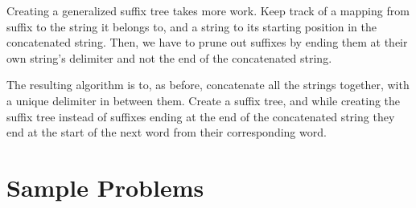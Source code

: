\documentclass[11pt, oneside]{article}
\begin{document}
Creating a generalized suffix tree takes more work.
Keep track of a mapping from suffix to the string it belongs to,
and a string to its starting position in the concatenated string.
Then, we have to prune out suffixes by ending them at their own string's delimiter
and not the end of the concatenated string.

The resulting algorithm is to, as before, concatenate all the strings together, with a unique delimiter in between them.
Create a suffix tree, and while creating the suffix tree instead of suffixes ending at the end of the concatenated string
they end at the start of the next word from their corresponding word.

\newpage

\section{Sample Problems}
\end{document}
